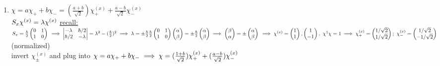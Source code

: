 \documentclass[12pt]{amsart}
\begin{document}
\begin{enumerate}
\item \underline{$\chi = a \chi_+ + b \chi_- = ( \frac{a + b}{\sqrt{2}}) \chi_+^{(x)} + \frac{a-b}{\sqrt{2}} \chi_{-}^{(x)}$}\\
$S_x \chi^{(x)} = \lambda \chi^{(x)}\\$
\underline{recall:} $S_x = \frac{\hbar}{2} \begin{pmatrix} 0 & 1 \\ 1 & 0 \end{pmatrix}\\
\implies \begin{vmatrix} - \lambda & \hbar/2 \\ \hbar/2 & - \lambda \end{vmatrix} = \lambda^2 - ( \frac{\hbar}{2})^2 \implies \lambda = \pm \frac{\hbar}{2}\\
\frac{\hbar}{2} \begin{pmatrix} 0 & 1 \\ 1 & 0 \end{pmatrix} \begin{pmatrix} \alpha \\ \beta \end{pmatrix} = \pm \frac{\hbar}{2} \begin{pmatrix} \alpha \\ \beta \end{pmatrix} \implies \begin{pmatrix} \beta \\ \alpha \end{pmatrix} = \pm \begin{pmatrix} \alpha \\ \beta \end{pmatrix}\\
\implies \chi^{(x)} = \begin{pmatrix} 1 \\ 1 \end{pmatrix}, \begin{pmatrix} 1 \\ -1 \end{pmatrix},\,\, \chi^{\dagger} \chi = 1\\
\implies \chi_+^{(x)} = \begin{pmatrix} 1/ \sqrt{2} \\ 1/ \sqrt{2} \end{pmatrix};\,\, \chi_-^{(x)} = \begin{pmatrix} 1/ \sqrt{2} \\ - 1/\sqrt{2} \end{pmatrix}$ (normalized)\\
invert $\chi_{\pm}^{(x)}$ and plug into $\chi = a \chi_+ + b \chi_-\\
\implies \chi = ( \frac{1 + b}{ \sqrt{2}}) \chi_+^{(x)} + ( \frac{a-b}{\sqrt{2}}) \chi_-^{(x)}\\$



\end{enumerate}
\end{document}
